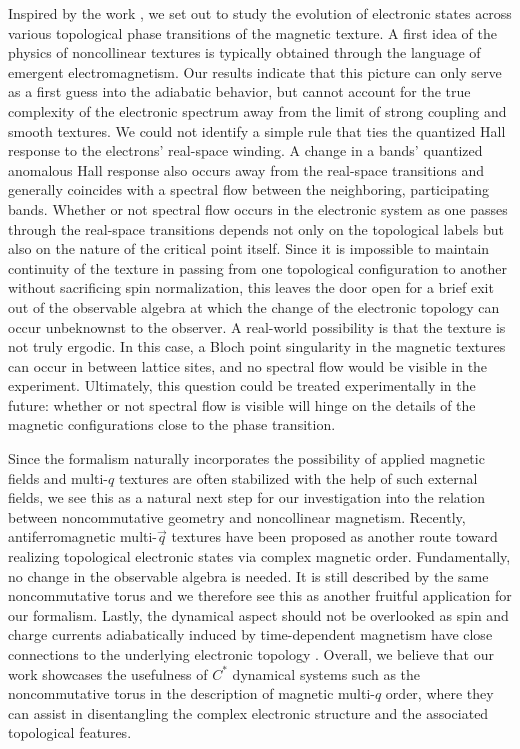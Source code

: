 \documentclass[submission, Phys]{SciPost}
\begin{document}
Inspired by the work \cite{Shimizu2022}, we set out to study the evolution of electronic states across various topological phase transitions of the magnetic texture.
A first idea of the physics of noncollinear textures is typically obtained through the language of emergent electromagnetism.
Our results indicate that this picture can only serve as a first guess into the adiabatic behavior, but cannot account for the true complexity of the electronic spectrum away from the limit of strong coupling and smooth textures.
We could not identify a simple rule that ties the quantized Hall response to the electrons' real-space winding.
A change in a bands' quantized anomalous Hall response also occurs away from the real-space transitions and generally coincides with a spectral flow between the neighboring, participating bands.
Whether or not spectral flow occurs in the electronic system as one passes through the real-space transitions depends not only on the topological labels but also on the nature of the critical point itself. 
Since it is impossible to maintain continuity of the texture in passing from one topological configuration to another without sacrificing spin normalization, this leaves the door open for a brief exit out of the observable algebra at which the change of the electronic topology can occur unbeknownst to the observer. 
A real-world possibility is that the texture is not truly ergodic. 
In this case, a Bloch point singularity in the magnetic textures can occur in between lattice sites, and no spectral flow would be visible in the experiment. 
Ultimately, this question could be treated experimentally in the future: 
whether or not spectral flow is visible will hinge on the details of the magnetic configurations close to the phase transition.

Since the formalism naturally incorporates the possibility of applied magnetic fields and multi-$q$ textures are often stabilized with the help of such external fields, we see this as a natural next step for our investigation into the relation between noncommutative geometry and noncollinear magnetism.
Recently, antiferromagnetic multi-$\vec{q}$ textures have been proposed as another route toward realizing topological electronic states via complex magnetic order. 
Fundamentally, no change in the observable algebra is needed. 
It is still described by the same noncommutative torus and we therefore see this as another fruitful application for our formalism.
Lastly, the dynamical aspect should not be overlooked as spin and charge currents adiabatically induced by time-dependent magnetism have close connections to the underlying electronic topology \cite{Yang2011}.
Overall, we believe that our work showcases the usefulness of $C^\ast$ dynamical systems such as the noncommutative torus in the description of magnetic multi-$q$ order, where they can assist in disentangling the complex electronic structure and the associated topological features.
\end{document}
